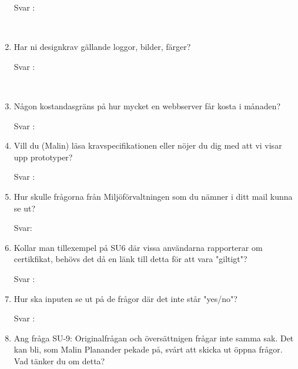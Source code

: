 \documentclass{article}
\begin{document}
\begin{enumerate}
        \begin{description}
            \item[Svar :]
        \end{description}
    \\
    \item  Har ni designkrav gällande loggor, bilder, färger?
     \begin{description}
            \item[Svar :]
        \end{description}
    \\
    \item Någon kostandasgräns på hur mycket en webbserver får kosta i månaden?
        \begin{description}
            \item[Svar :]
        \end{description}
        \item Vill du (Malin) läsa kravspecifikationen
        eller nöjer du dig med att vi visar upp
        prototyper?
         \begin{description}
            \item[Svar :]
        \end{description}

        \item Hur skulle frågorna från Miljöförvaltningen som du nämner i ditt mail kunna se ut?
        \begin{description}
        	\item[Svar:]
\end{description}      

     \item Kollar man tillexempel på SU6 där vissa användarna rapporterar om certikfikat, behövs det då en länk till detta för att vara "giltigt"? 
    
        \begin{description}
            \item[Svar :]
        \end{description}
        
             \item Hur ska inputen se ut på de frågor där det inte står "yes/no"? 
    
        \begin{description}
            \item[Svar :]
        \end{description}
        
         \item Ang fråga SU-9: Originalfrågan och översättnigen frågar inte samma sak. Det kan bli, som Malin Planander pekade på, svårt att skicka ut öppna frågor. Vad tänker du om detta?
    

\end{enumerate}
\end{document}
